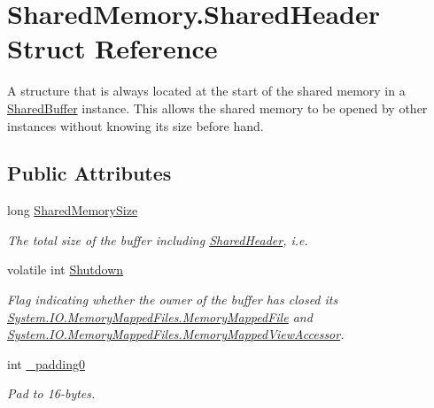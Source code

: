 \hypertarget{struct_shared_memory_1_1_shared_header}{}\section{Shared\+Memory.\+Shared\+Header Struct Reference}
\label{struct_shared_memory_1_1_shared_header}


A structure that is always located at the start of the shared memory in a \hyperlink{class_shared_memory_1_1_shared_buffer}{Shared\+Buffer} instance. This allows the shared memory to be opened by other instances without knowing its size before hand.  


\subsection*{Public Attributes}
\begin{DoxyCompactItemize}
\item 
long \hyperlink{struct_shared_memory_1_1_shared_header_abc3cc4a636cd2a69034692a0efb6f264}{Shared\+Memory\+Size}
\begin{DoxyCompactList}\small\item\em The total size of the buffer including \hyperlink{struct_shared_memory_1_1_shared_header}{Shared\+Header}, i.\+e. \end{DoxyCompactList}\item 
volatile int \hyperlink{struct_shared_memory_1_1_shared_header_a322c651d49080ce9021fed3e79aeee5b}{Shutdown}
\begin{DoxyCompactList}\small\item\em Flag indicating whether the owner of the buffer has closed its \hyperlink{class_system_1_1_i_o_1_1_memory_mapped_files_1_1_memory_mapped_file}{System.\+I\+O.\+Memory\+Mapped\+Files.\+Memory\+Mapped\+File} and \hyperlink{class_system_1_1_i_o_1_1_memory_mapped_files_1_1_memory_mapped_view_accessor}{System.\+I\+O.\+Memory\+Mapped\+Files.\+Memory\+Mapped\+View\+Accessor}. \end{DoxyCompactList}\item 
int \hyperlink{struct_shared_memory_1_1_shared_header_a8c49168c17cca7506c00915c7b6528ef}{\+\_\+padding0}
\begin{DoxyCompactList}\small\item\em Pad to 16-\/bytes. \end{DoxyCompactList}\end{DoxyCompactItemize}


